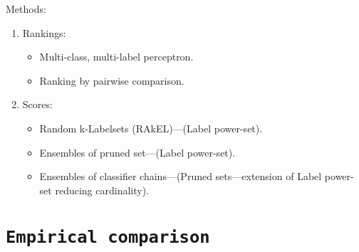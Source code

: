 \documentclass[12pt,a4paper,twocolumn]{article}
\begin{document}
Methods:
\begin{enumerate}
\item Rankings:
	\begin{itemize}
	\item Multi-class, multi-label perceptron.
	\item Ranking by pairwise comparison.
	\end{itemize}
\item Scores:
	\begin{itemize}
	\item Random k-Labelsets (RAkEL)---(Label power-set).
	\item Ensembles of pruned set---(Label power-set).
	\item Ensembles of classifier chains---(Pruned sets---extension of Label power-set reducing cardinality).
	\end{itemize}
\end{enumerate}

\section*{\texttt{Empirical comparison}}

\end{document}
